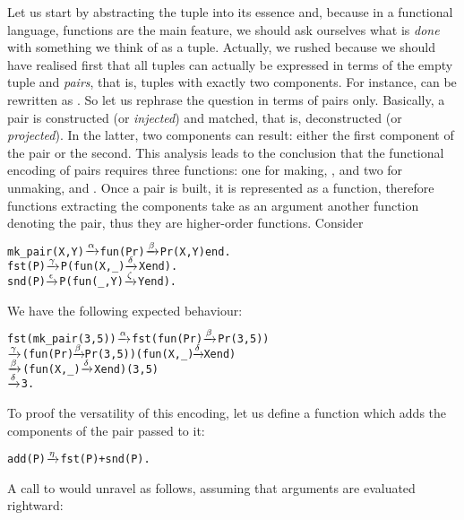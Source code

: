 Let us start by abstracting the tuple into its essence and, because in
a functional language, functions are the main feature, we should ask
ourselves what is \emph{done} with something we think of as a
tuple. Actually, we rushed because we should have realised first that
all tuples can actually be expressed in terms of the empty tuple and
\emph{pairs}, that is, tuples with exactly two components. For
instance,  can be rewritten
as . So let us
rephrase the question in terms of pairs only. Basically, a pair is
constructed (or \emph{injected}) and matched, that is, deconstructed (or
\emph{projected}). In the latter, two components can result: either
the first component of the pair or the second. This analysis leads to
the conclusion that the functional encoding of pairs requires three
functions: one for making, , and two for unmaking,
 and . Once a pair is built, it is
represented as a function, therefore functions extracting the
components take as an argument another function denoting the pair,
thus they are higher\hyp{}order functions. Consider
\begin{alltt}
mk_pair(X,Y) \(\smashedrightarrow{\alpha}\) fun(Pr) \(\smashedrightarrow{\beta}\) Pr(X,Y) end.\hfill%Pr \emph{is a projection}
fst(P) \(\smashedrightarrow{\gamma}\) P(fun(X,_) \(\smashedrightarrow{\delta}\) X end).\hfill% P \emph{denotes a pair}
snd(P) \(\smashedrightarrow{\epsilon}\) P(fun(_,Y) \(\smashedrightarrow{\zeta}\) Y end).
\end{alltt}
We have the following expected behaviour:
\begin{alltt}
fst(mk_pair(3,5)) \(\smashedrightarrow{\alpha}\) fst(fun(Pr) \(\smashedrightarrow{\beta}\) Pr(3,5))
                  \(\smashedrightarrow{\gamma}\) (fun(Pr) \(\!\smashedrightarrow{\beta}\!\) Pr(3,5))(fun(X,_) \(\!\smashedrightarrow{\delta}\!\) X end)
                  \(\smashedrightarrow{\beta}\) (fun(X,_) \(\smashedrightarrow{\delta}\) X end)(3,5)
                  \(\smashedrightarrow{\delta}\) 3.
\end{alltt}
To proof the versatility of this encoding, let us define a function
 which adds the components of the pair passed to it:
\begin{alltt}
add(P) \(\smashedrightarrow{\eta}\) fst(P) + snd(P).
\end{alltt}
A call to  would unravel as follows, assuming that
arguments are evaluated rightward:
